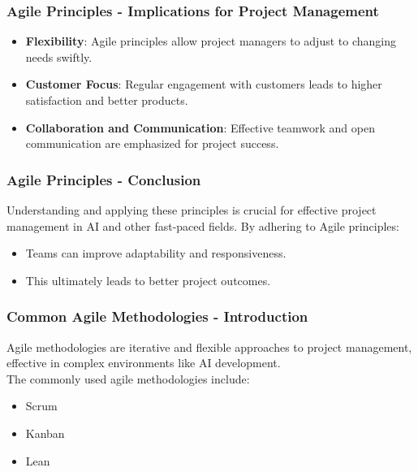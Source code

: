\documentclass{beamer}
\begin{document}
\begin{frame}[fragile]
    \frametitle{Agile Principles - Implications for Project Management}
    \begin{itemize}
        \item \textbf{Flexibility}: Agile principles allow project managers to adjust to changing needs swiftly.
        \item \textbf{Customer Focus}: Regular engagement with customers leads to higher satisfaction and better products.
        \item \textbf{Collaboration and Communication}: Effective teamwork and open communication are emphasized for project success.
    \end{itemize}
\end{frame}

\begin{frame}[fragile]
    \frametitle{Agile Principles - Conclusion}
    Understanding and applying these principles is crucial for effective project management in AI and other fast-paced fields. By adhering to Agile principles:
    \begin{itemize}
        \item Teams can improve adaptability and responsiveness.
        \item This ultimately leads to better project outcomes.
    \end{itemize}
\end{frame}

\begin{frame}[fragile]
    \frametitle{Common Agile Methodologies - Introduction}
    Agile methodologies are iterative and flexible approaches to project management, effective in complex environments like AI development. 
    \\[1em]
    The commonly used agile methodologies include:
    \begin{itemize}
        \item Scrum
        \item Kanban
        \item Lean
    \end{itemize}
\end{frame}
\end{document}
